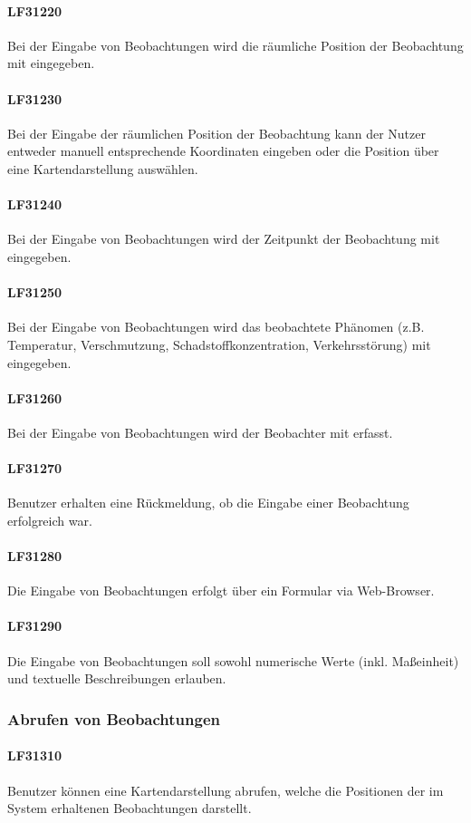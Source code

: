 \documentclass[a4paper,11pt]{article}             %
\begin{document}
\paragraph{LF31220}
 Bei der Eingabe von Beobachtungen wird die räumliche Position der Beobachtung mit eingegeben.		
\paragraph{LF31230}
Bei der Eingabe der räumlichen Position der Beobachtung kann der Nutzer entweder manuell entsprechende Koordinaten eingeben oder die Position über eine Kartendarstellung auswählen.		\paragraph{LF31240}
Bei der Eingabe von Beobachtungen wird der Zeitpunkt der Beobachtung mit eingegeben.			\paragraph{LF31250}
Bei der Eingabe von Beobachtungen wird das beobachtete Phänomen (z.B. Temperatur, Verschmutzung, Schadstoffkonzentration, Verkehrsstörung) mit eingegeben.
\paragraph{LF31260}
Bei der Eingabe von Beobachtungen wird der Beobachter mit erfasst.
\paragraph{LF31270}
Benutzer erhalten eine Rückmeldung, ob die Eingabe einer Beobachtung erfolgreich war.
\paragraph{LF31280}
Die Eingabe von Beobachtungen erfolgt über ein Formular via Web-Browser.
\paragraph{LF31290}
Die Eingabe von Beobachtungen soll sowohl numerische Werte (inkl. Maßeinheit) und textuelle Beschreibungen erlauben.
\subsubsection{Abrufen von Beobachtungen}
\paragraph{LF31310}
Benutzer können eine Kartendarstellung abrufen, welche die Positionen der im System erhaltenen Beobachtungen darstellt.
\end{document}
